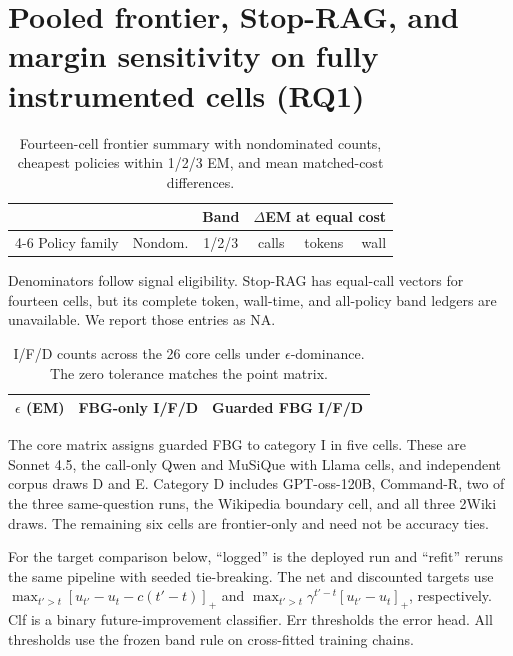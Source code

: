 \documentclass[manuscript,nonacm]{acmart}
\begin{document}
\FloatBarrier
\section{Pooled frontier, Stop-RAG, and margin sensitivity on fully instrumented cells (RQ1)}

\begin{table}[!htbp]
\caption{Fourteen-cell frontier summary with nondominated counts, cheapest
policies within 1/2/3 EM, and mean matched-cost differences.}
\label{tab:supp-whowins-instrumented}
\footnotesize
\setlength{\tabcolsep}{2.5pt}
\begin{tabular}{@{}lccrrr@{}}
\toprule
& & Band & \multicolumn{3}{c}{$\Delta$EM at equal cost} \\
\cmidrule(lr){4-6}
Policy family & Nondom. & 1/2/3 & calls & tokens & wall \\
\midrule

\bottomrule
\end{tabular}
\end{table}

Denominators follow signal eligibility. Stop-RAG has equal-call vectors for
fourteen cells, but its complete token, wall-time, and all-policy band ledgers
are unavailable. We report those entries as NA.

\begin{table}[htbp]
\caption{I/F/D counts across the 26 core cells under
$\epsilon$-dominance. The zero tolerance matches the point matrix.}
\label{tab:supp-epsilon}
\small
\begin{tabular}{lcc}
\toprule
$\epsilon$ (EM) & FBG-only I/F/D & Guarded FBG I/F/D \\
\midrule

\bottomrule
\end{tabular}
\end{table}


\label{supp:pooled}

The core matrix assigns guarded FBG to category I in five cells. These are
Sonnet 4.5, the call-only Qwen and MuSiQue with Llama cells, and independent
corpus draws D and E. Category D includes GPT-oss-120B, Command-R, two of the
three same-question runs, the Wikipedia boundary cell, and all three 2Wiki
draws. The remaining six cells are frontier-only and need not be accuracy
ties.

For the target comparison below, ``logged'' is the deployed run and ``refit''
reruns the same pipeline with seeded tie-breaking. The net and discounted
targets use $\max_{t'>t}[u_{t'}-u_t-c(t'-t)]_+$ and
$\max_{t'>t}\gamma^{t'-t}[u_{t'}-u_t]_+$, respectively. Clf is a
binary future-improvement classifier. Err thresholds the error head. All thresholds
use the frozen band rule on cross-fitted training chains.
\end{document}
